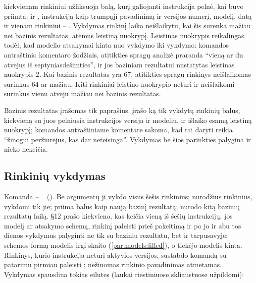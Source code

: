  kiekvienam rinkiniui užfiksuoja balą, kurį galiojanti
instrukcija pelnė, kai buvo priimta:  ir , instrukciją kaip trumpąjį
pavadinimą ir versijos numerį, modelį, datą ir vienam rinkiniui -- . Vykdymas
rinkinį laiko neišlaikytu, kai šis surenka mažiau nei bazinis rezultatas, atėmus leistiną
nuokrypį. Leistinas nuokrypis reikalingas todėl, kad modelio atsakymai kinta nuo vykdymo iki
vykdymo: komandos antraštinio komentaro žodžiais, atitikties spragų analizė praranda
\enquote{vieną ar du atvejus iš septyniasdešimties}, ir jos baziniam rezultatui nustatytas
leistinas nuokrypis 2. Kai bazinis rezultatas yra 67, atitikties spragų rinkinys neišlaikomas surinkus
64 ar mažiau. Kiti rinkiniai leistino nuokrypio neturi ir neišlaikomi surinkus vienu atveju
mažiau nei bazinis rezultatas.

Bazinis rezultatas įrašomas tik paprašius.  įrašo ką tik vykdytų rinkinių
balus, kiekvieną su juos pelniusia instrukcijos versija ir modeliu, ir išlaiko esamą
leistiną nuokrypį; komandos antraštiniame komentare sakoma, kad tai daryti reikia
\enquote{žmogui peržiūrėjus, kas dar neteisinga}. Vykdymas be šios parinkties palygina ir
nieko nekeičia.

\subsection{Rinkinių vykdymas}\label{sec:control:command}

Komanda -- ~
(). Be argumentų ji vykdo visus šešis
rinkinius; nurodžius rinkinius, vykdomi tik jie;  priima balus kaip naują
bazinį rezultatą;  nurodo kitą bazinių rezultatų failą.
 §12 prašo kiekvieno, kas keičia vieną iš šešių instrukcijų,
jos modelį ar atsakymo schemą, rinkinį paleisti prieš pakeitimą ir po jo ir abu tos dienos
vykdymus palyginti ne tik su baziniu rezultatu, bet ir tarpusavyje: schemos formą modelis irgi
skaito (\cref{par:models:filled}), o tiekėjo modelis kinta. Rinkinys, kurio instrukcija neturi
aktyvios versijos, sustabdo komandą su patarimu pirmiau paleisti ;
nežinomas rinkinio pavadinimas atmetamas. Vykdymas spausdina tokias eilutes (laukai
riestiniuose skliaustuose užpildomi):


